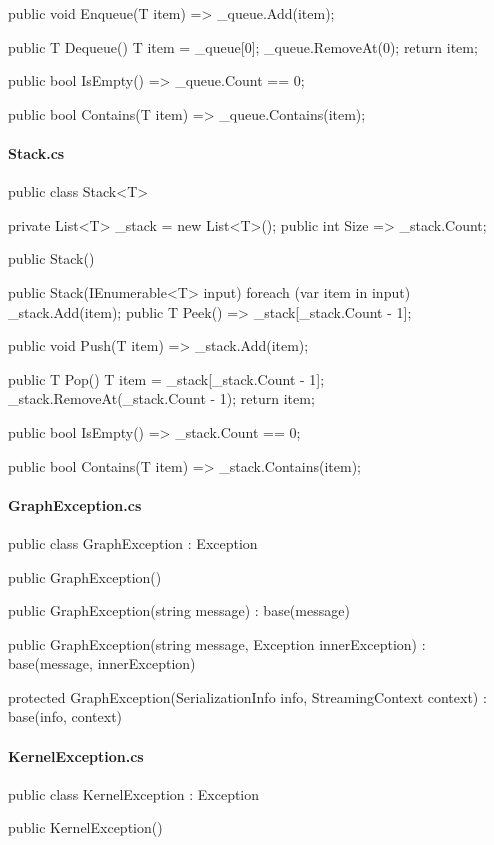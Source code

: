 \begin{flushleft}
\begin{cscode}
{    public void Enqueue(T item) => _queue.Add(item);

    public T Dequeue()
    {
        T item = _queue[0];
        _queue.RemoveAt(0);
        return item;
    }

    public bool IsEmpty() => _queue.Count == 0;

    public bool Contains(T item) => _queue.Contains(item);
}
    \end{cscode}
    
    \paragraph{Stack.cs}
    \begin{cscode}
public class Stack<T>
{
    private List<T> _stack = new List<T>();
    public int Size => _stack.Count;

    public Stack() { }

    public Stack(IEnumerable<T> input)
    {
        foreach (var item in input) _stack.Add(item);
    }
    public T Peek() => _stack[_stack.Count - 1];

    public void Push(T item) => _stack.Add(item);

    public T Pop()
    {
        T item = _stack[_stack.Count - 1];
        _stack.RemoveAt(_stack.Count - 1);
        return item;
    }

    public bool IsEmpty() => _stack.Count == 0;

    public bool Contains(T item) => _stack.Contains(item);
}
    \end{cscode}
    
    \paragraph{GraphException.cs}
    \begin{cscode}
[Serializable]
public class GraphException : Exception
{
    public GraphException()
    {
    }

    public GraphException(string message) : base(message)
    {
    }

    public GraphException(string message, Exception innerException) : base(message, innerException)
    {
    }

    protected GraphException(SerializationInfo info, StreamingContext context) : base(info, context)
    {
    }
}
    \end{cscode}
    
    \paragraph{KernelException.cs}
    \begin{cscode}
[Serializable]
public class KernelException : Exception
{
    public KernelException()
    {
    }

}
\end{cscode}
\end{flushleft}
